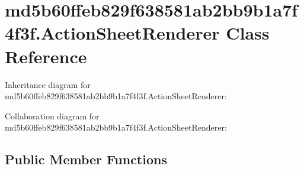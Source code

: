 \hypertarget{classmd5b60ffeb829f638581ab2bb9b1a7f4f3f_1_1_action_sheet_renderer}{}\section{md5b60ffeb829f638581ab2bb9b1a7f4f3f.\+Action\+Sheet\+Renderer Class Reference}
\label{classmd5b60ffeb829f638581ab2bb9b1a7f4f3f_1_1_action_sheet_renderer}


Inheritance diagram for md5b60ffeb829f638581ab2bb9b1a7f4f3f.\+Action\+Sheet\+Renderer\+:


Collaboration diagram for md5b60ffeb829f638581ab2bb9b1a7f4f3f.\+Action\+Sheet\+Renderer\+:
\subsection*{Public Member Functions}
